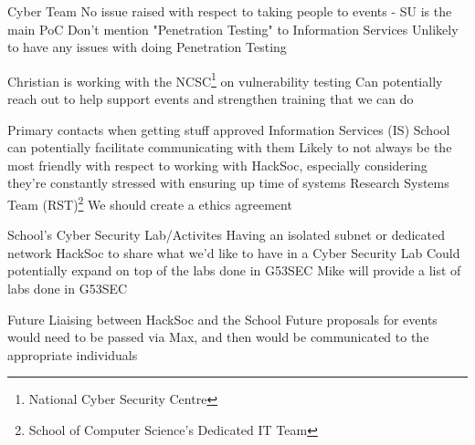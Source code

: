 \documentclass[11pt,hacksoc]{meetingmins}
\begin{document}
\begin{items}
	\item Cyber Team
		\subitem No issue raised with respect to taking people to events - SU is the main PoC
		\subitem Don't mention "Penetration Testing" to Information Services
		\subitem Unlikely to have any issues with doing Penetration Testing
		
	\item Christian is working with the NCSC\footnote{National Cyber Security Centre} on vulnerability testing
		\subitem Can potentially reach out to help support events and strengthen training that we can do
		
	\item Primary contacts when getting stuff approved
		\subitem Information Services (IS)
			\subsubitem School can potentially facilitate communicating with them
			\subsubitem Likely to not always be the most friendly with respect to working with HackSoc, especially considering they're constantly stressed with ensuring up time of systems
		\subitem Research Systems Team (RST)\footnote{School of Computer Science's Dedicated IT Team}
		\subitem We should create a ethics agreement 
		
	\item School's Cyber Security Lab/Activites
		\subitem Having an isolated subnet or dedicated network
		\subitem HackSoc to share what we'd like to have in a Cyber Security Lab
		\subitem Could potentially expand on top of the labs done in G53SEC
			\subsubitem Mike will provide a list of labs done in G53SEC
		
	\item Future Liaising between HackSoc and the School
		\subitem Future proposals for events would need to be passed via Max, and then would be communicated to the appropriate individuals
		
\end{items}
\end{document}
